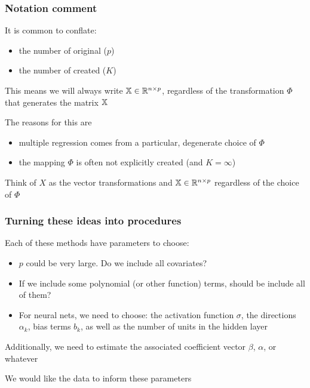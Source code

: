\documentclass{beamer}
\begin{document}
\begin{frame}
\frametitle{Notation comment}

   It is common
to conflate:
\begin{itemize}
\item the number of original  ($p$)
\item the number of created  ($K$)
\end{itemize}

\vsp
This means we will always write $\mathbb{X} \in \mathbb{R}^{n\times p}$, regardless of the transformation $\Phi$ that generates
the matrix $\mathbb{X}$

\vsp
The reasons for this are
\begin{itemize}
\item  multiple regression comes from a particular, degenerate choice of $\Phi$
\item the mapping $\Phi$ is often not explicitly created (and $K=\infty$)
\end{itemize}

\vsp
{} Think of $X$ as  the vector  transformations and $\mathbb{X} \in \mathbb{R}^{n \times p}$
regardless of the choice of $\Phi$
\end{frame}



\begin{frame}
\frametitle{Turning these ideas into procedures}
Each of these methods have parameters to choose:

\begin{itemize}
\item $p$ could be very large.  Do we include all covariates?
\item If we include some polynomial (or other function) terms, should be include all of them?
\item For neural nets, we need to choose: the activation function $\sigma$, the directions $\alpha_k$,  bias terms $b_k$, as well as the number of units in the hidden layer
\end{itemize}
\vsp

Additionally, we need to estimate the associated coefficient vector $\beta$, $\alpha$, or whatever

\vsp
We would like the data to inform these parameters
\end{frame}
\end{document}
